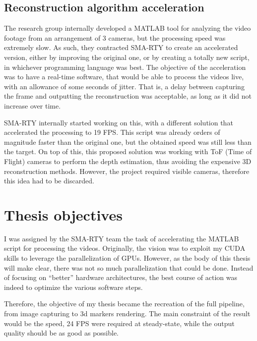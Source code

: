 \subsection{Reconstruction algorithm acceleration}

The research group internally developed a MATLAB tool for analyzing the video footage from an arrangement of 3 cameras, but the processing speed was extremely slow.
As such, they contracted SMA-RTY to create an accelerated version, either by improving the original one, or by creating a totally new script, in whichever programming language was best.
The objective of the acceleration was to have a real-time software, that would be able to process the videos live, with an allowance of some seconds of jitter.
That is, a delay between capturing the frame and outputting the reconstruction was acceptable, as long as it did not increase over time.

SMA-RTY internally started working on this, with a different solution that accelerated the processing to 19 FPS.
This script was already orders of magnitude faster than the original one, but the obtained speed was still less than the target.
On top of this, this proposed solution was working with ToF (Time of Flight) cameras to perform the depth estimation, thus avoiding the expensive 3D reconstruction methods.
However, the project required visible cameras, therefore this idea had to be discarded.

\section{Thesis objectives}

I was assigned by the SMA-RTY team the task of accelerating the MATLAB script for processing the videos.
Originally, the vision was to exploit my CUDA skills to leverage the parallelization of GPUs.
However, as the body of this thesis will make clear, there was not so much parallelization that could be done.
Instead of focusing on ``better'' hardware architectures, the best course of action was indeed to optimize the various software steps.

Therefore, the objective of my thesis became the recreation of the full pipeline, from image capturing to 3d markers rendering.
The main constraint of the result would be the speed, 24 FPS were required at steady-state, while the output quality should be as good as possible.
